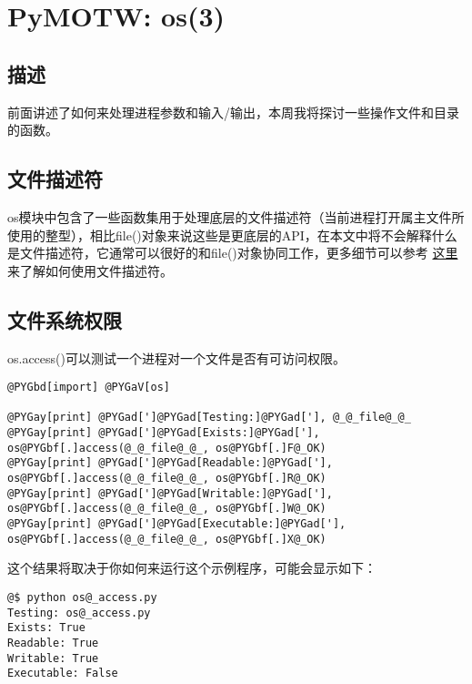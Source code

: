 \documentclass[letterpaper,10pt,english]{manual}
\begin{document}
\resetcurrentobjects


\section{PyMOTW: os(3)}


\subsection{描述}

前面讲述了如何来处理进程参数和输入/输出，本周我将探讨一些操作文件和目录的函数。


\subsection{文件描述符}

os模块中包含了一些函数集用于处理底层的文件描述符（当前进程打开属主文件所使用的整型），相比file()对象来说这些是更底层的API，在本文中将不会解释什么是文件描述符，它通常可以很好的和file()对象协同工作，更多细节可以参考 \href{http://docs.python.org/lib/os-fd-ops.html}{这里} 来了解如何使用文件描述符。


\subsection{文件系统权限}

os.access()可以测试一个进程对一个文件是否有可访问权限。

\begin{Verbatim}[commandchars=@\[\]]
@PYGbd[import] @PYGaV[os]

@PYGay[print] @PYGad[']@PYGad[Testing:]@PYGad['], @_@_file@_@_
@PYGay[print] @PYGad[']@PYGad[Exists:]@PYGad['], os@PYGbf[.]access(@_@_file@_@_, os@PYGbf[.]F@_OK)
@PYGay[print] @PYGad[']@PYGad[Readable:]@PYGad['], os@PYGbf[.]access(@_@_file@_@_, os@PYGbf[.]R@_OK)
@PYGay[print] @PYGad[']@PYGad[Writable:]@PYGad['], os@PYGbf[.]access(@_@_file@_@_, os@PYGbf[.]W@_OK)
@PYGay[print] @PYGad[']@PYGad[Executable:]@PYGad['], os@PYGbf[.]access(@_@_file@_@_, os@PYGbf[.]X@_OK)
\end{Verbatim}

这个结果将取决于你如何来运行这个示例程序，可能会显示如下：

\begin{Verbatim}[commandchars=@\[\]]
@$ python os@_access.py
Testing: os@_access.py
Exists: True
Readable: True
Writable: True
Executable: False
\end{Verbatim}
\end{document}
